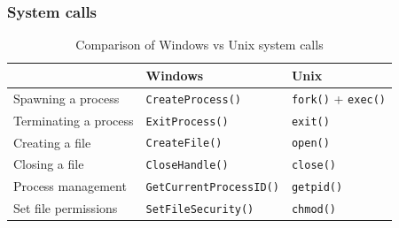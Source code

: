 \begin{frame}
\frametitle{System calls}


\begin{table}[ht]
\setlength{\tabcolsep}{4pt} %
\centering
\small
\renewcommand{\arraystretch}{1.2}
\begin{tabularx}{\textwidth}{|>{\raggedright\arraybackslash}X|>{\raggedright\arraybackslash}X|>{\raggedright\arraybackslash}X|}
\hline
 & \textbf{Windows} & \textbf{Unix} \\ \hline
Spawning a process    & \texttt{CreateProcess()}     & \texttt{fork()} + \texttt{exec()} \\ \hline
Terminating a process & \texttt{ExitProcess()}       & \texttt{exit()} \\ \hline
Creating a file       & \texttt{CreateFile()}        & \texttt{open()} \\ \hline
Closing a file        & \texttt{CloseHandle()}       & \texttt{close()} \\ \hline
Process management & \texttt{GetCurrent\-Process\-ID()} & \texttt{getpid()} \\ \hline
Set file permissions  & \texttt{SetFileSecurity()}   & \texttt{chmod()} \\ \hline
\end{tabularx}
\caption{Comparison of Windows vs Unix system calls \cite{linux-syscalls} \cite{linux-iface} \cite{windows-syscalls-blog}}
\end{table}

\end{frame}